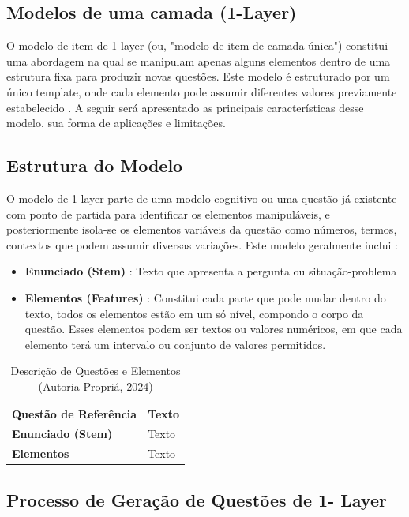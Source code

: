 \subsection{Modelos de uma camada (1-Layer)}

O modelo de item de 1-layer (ou, "modelo de item de camada única") constitui uma abordagem na qual se manipulam apenas alguns elementos dentro de uma estrutura fixa para produzir novas questões. Este modelo é estruturado por um único template, onde cada elemento pode assumir diferentes valores previamente estabelecido \parencite{lai2013}. A seguir será apresentado as principais características desse modelo, sua forma de aplicações e limitações.

\subsection{Estrutura do Modelo}

O modelo de 1-layer parte de uma modelo cognitivo ou uma questão já existente com ponto de partida para identificar os elementos manipuláveis, e posteriormente isola-se os elementos variáveis da questão como números, termos, contextos que podem assumir diversas variações. Este modelo geralmente inclui : 

\begin{itemize}
    \item \textbf{Enunciado (Stem)} : Texto que apresenta a pergunta ou situação-problema
    \item \textbf{Elementos (Features)} : Constitui cada parte que pode mudar dentro do texto, todos os elementos estão em um só nível, compondo o corpo da questão. Esses elementos podem ser textos ou valores numéricos, em que cada elemento terá um intervalo ou conjunto de valores permitidos.
\end{itemize}


\begin{table}[htbp]
    \centering
    \begin{tabular}{|l|p{10cm}|}
        \hline
        \textbf{Questão de Referência} & Texto \\ \hline
        \textbf{Enunciado (Stem)} & Texto \\ \hline
        \textbf{Elementos} & Texto \\ \hline
    \end{tabular}
    \caption{Descrição de Questões e Elementos (Autoria Propriá, 2024)}
    \label{tab:table-questoes-elementos}
\end{table}

\subsection{Processo de Geração de Questões de 1- Layer}

